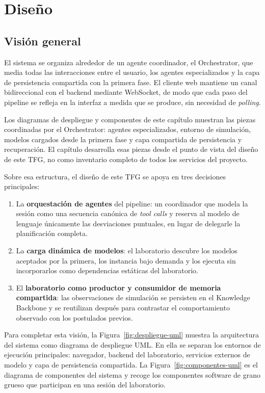 \chapter{Diseño}

\section{Visión general}

El sistema se organiza alrededor de un agente coordinador, el
Orchestrator, que media todas las interacciones entre el usuario, los
agentes especializados y la capa de persistencia compartida con la
primera fase. El cliente web mantiene un canal bidireccional con el
backend mediante WebSocket, de modo que cada paso del pipeline se refleja
en la interfaz a medida que se produce, sin necesidad de \textit{polling}.

Los diagramas de despliegue y componentes de este capítulo muestran las piezas
coordinadas por el Orchestrator: agentes especializados, entorno de simulación,
modelos cargados desde la primera fase y capa compartida de persistencia y
recuperación. El capítulo desarrolla esas piezas desde el punto de vista del
diseño de este TFG, no como inventario completo de todos los servicios
del proyecto.

Sobre esa estructura, el diseño de este TFG se apoya en tres decisiones
principales:

\begin{enumerate}
\item La \textbf{orquestación de agentes} del pipeline: un coordinador que
modela la sesión como una secuencia canónica de \textit{tool calls} y
reserva al modelo de lenguaje únicamente las desviaciones puntuales, en
lugar de delegarle la planificación completa.
\item La \textbf{carga dinámica de modelos}: el laboratorio descubre los
modelos aceptados por la primera, los instancia bajo demanda y los ejecuta
sin incorporarlos como dependencias estáticas del laboratorio.
\item El \textbf{laboratorio como productor y consumidor de memoria
compartida}: las observaciones de simulación se persisten en el
Knowledge Backbone y se reutilizan después para contrastar el
comportamiento observado con los postulados previos.
\end{enumerate}

Para completar esta visión, la
Figura~\ref{fig:despliegue-uml} muestra la arquitectura del sistema como
diagrama de despliegue UML. En ella se separan los entornos de ejecución
principales: navegador, backend del laboratorio, servicios externos de
modelo y capa de persistencia compartida. La Figura~\ref{fig:componentes-uml}
es el diagrama de componentes del sistema y recoge los componentes software de
grano grueso que participan en una sesión del laboratorio.

